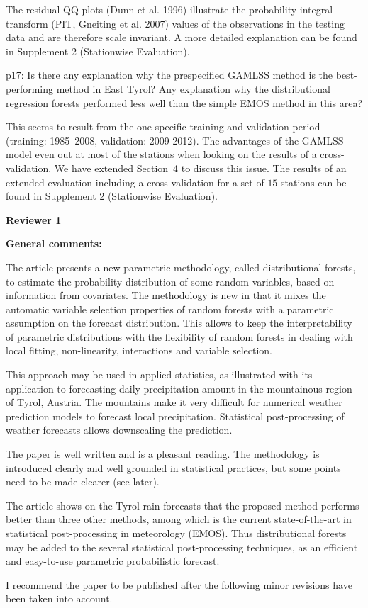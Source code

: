 \documentclass[american,foldmarks=false,noconfig]{uibklttr}
\newenvironment{review}{\fontshape{\itdefault}\fontseries{\bfdefault} \selectfont \smallskip}{\par}
\begin{document}
The residual QQ plots (Dunn et al. 1996) illustrate the probability 
integral transform (PIT, Gneiting et al. 2007) values of the observations 
in the testing data and are therefore scale invariant. A more detailed 
explanation can be found in Supplement 2 (Stationwise Evaluation).

\begin{review}
p17: Is there any explanation why the prespecified GAMLSS 
method is the best-performing method in East Tyrol? Any 
explanation why the distributional regression forests 
performed less well than the simple EMOS method in this area?
\end{review}

This seems to result from the one specific training and validation period 
(training: 1985--2008, validation: 2009-2012).
The advantages of the GAMLSS model even out at most of the stations when looking 
on the results of a cross-validation. We have extended Section~4 to discuss this 
issue. The results of an extended evaluation including a cross-validation for a 
set of $15$ stations can be found in Supplement 2 (Stationwise Evaluation).

\newpage


\textbf{\LARGE Reviewer 1}

\bigskip

\textbf{General comments:}

\begin{review}
The article presents a new parametric methodology, called 
distributional forests, to estimate the probability 
distribution of some random variables, based on information 
from covariates. The methodology is new in that it mixes the
automatic variable selection properties of random forests 
with a parametric assumption on the forecast distribution. 
This allows to keep the interpretability of parametric 
distributions with the flexibility of random forests in 
dealing with local fitting, non-linearity, interactions 
and variable selection.

This approach may be used in applied statistics, as 
illustrated with its application to forecasting daily 
precipitation amount in the mountainous region of Tyrol, 
Austria. The mountains make it very difficult for numerical 
weather prediction models to forecast local precipitation. 
Statistical post-processing of weather forecasts allows 
downscaling the prediction.

The paper is well written and is a pleasant reading. 
The methodology is introduced clearly and well grounded 
in statistical practices, but some points need to be 
made clearer (see later).

The article shows on the Tyrol rain forecasts that the 
proposed method performs better than three other methods, 
among which is the current state-of-the-art in statistical 
post-processing in meteorology (EMOS). Thus distributional
forests may be added to the several statistical post-processing 
techniques, as an efficient and easy-to-use parametric 
probabilistic forecast.

I recommend the paper to be published after the following 
minor revisions have been taken into account.
\end{review}
\end{document}
